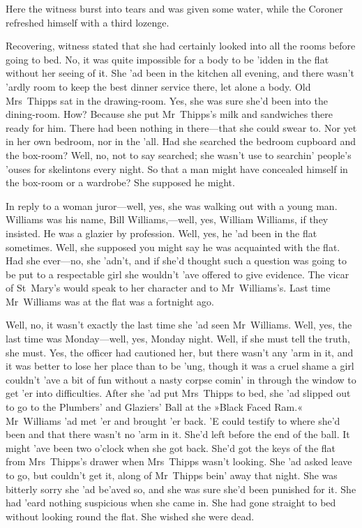 Here the witness burst into tears and was given some water, while the Coroner refreshed himself with a third lozenge.

Recovering, witness stated that she had certainly looked into all the rooms before going to bed. No, it was quite impossible for a body to be 'idden in the flat without her seeing of it. She 'ad been in the kitchen all evening, and there wasn't 'ardly room to keep the best dinner service there, let alone a body. Old Mrs~Thipps sat in the drawing-room. Yes, she was sure she'd been into the dining-room. How? Because she put Mr~Thipps's milk and sandwiches there ready for him. There had been nothing in there—that she could swear to. Nor yet in her own bedroom, nor in the 'all. Had she searched the bedroom cupboard and the box-room? Well, no, not to say searched; she wasn't use to searchin' people's 'ouses for skelintons every night. So that a man might have concealed himself in the box-room or a wardrobe? She supposed he might.

In reply to a woman juror—well, yes, she was walking out with a young man. Williams was his name, Bill Williams,---well, yes, William Williams, if they insisted. He was a glazier by profession. Well, yes, he 'ad been in the flat sometimes. Well, she supposed you might say he was acquainted with the flat. Had she ever—no, she 'adn't, and if she'd thought such a question was going to be put to a respectable girl she wouldn't 'ave offered to give evidence. The vicar of St~Mary's would speak to her character and to Mr~Williams's. Last time Mr~Williams was at the flat was a fortnight ago.

Well, no, it wasn't exactly the last time she 'ad seen Mr~Williams. Well, yes, the last time was Monday—well, yes, Monday night. Well, if she must tell the truth, she must. Yes, the officer had cautioned her, but there wasn't any 'arm in it, and it was better to lose her place than to be 'ung, though it was a cruel shame a girl couldn't 'ave a bit of fun without a nasty corpse comin' in through the window to get 'er into difficulties. After she 'ad put Mrs~Thipps to bed, she 'ad slipped out to go to the Plumbers' and Glaziers' Ball at the »Black Faced Ram.« Mr~Williams 'ad met 'er and brought 'er back. 'E could testify to where she'd been and that there wasn't no 'arm in it. She'd left before the end of the ball. It might 'ave been two o'clock when she got back. She'd got the keys of the flat from Mrs~Thipps's drawer when Mrs~Thipps wasn't looking. She 'ad asked leave to go, but couldn't get it, along of Mr~Thipps bein' away that night. She was bitterly sorry she 'ad be'aved so, and she was sure she'd been punished for it. She had 'eard nothing suspicious when she came in. She had gone straight to bed without looking round the flat. She wished she were dead.

